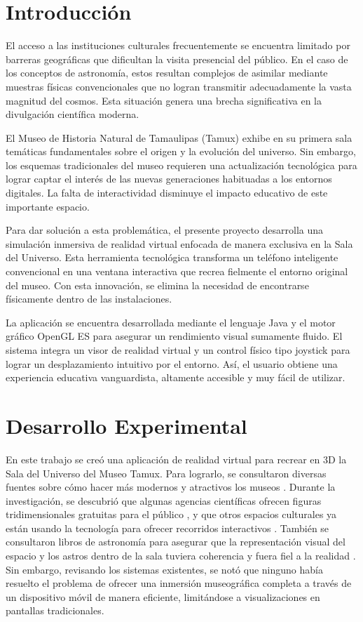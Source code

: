 \documentclass[conference]{IEEEtran}
\begin{document}
		
		
		
		\section{Introducción}
		El acceso a las instituciones culturales frecuentemente se encuentra limitado por barreras geográficas que dificultan la visita presencial del público. En el caso de los conceptos de astronomía, estos resultan complejos de asimilar mediante muestras físicas convencionales que no logran transmitir adecuadamente la vasta magnitud del cosmos. Esta situación genera una brecha significativa en la divulgación científica moderna.
		
		El Museo de Historia Natural de Tamaulipas (Tamux) exhibe en su primera sala temáticas fundamentales sobre el origen y la evolución del universo. Sin embargo, los esquemas tradicionales del museo requieren una actualización tecnológica para lograr captar el interés de las nuevas generaciones habituadas a los entornos digitales. La falta de interactividad disminuye el impacto educativo de este importante espacio.
		
		Para dar solución a esta problemática, el presente proyecto desarrolla una simulación inmersiva de realidad virtual enfocada de manera exclusiva en la Sala del Universo. Esta herramienta tecnológica transforma un teléfono inteligente convencional en una ventana interactiva que recrea fielmente el entorno original del museo. Con esta innovación, se elimina la necesidad de encontrarse físicamente dentro de las instalaciones.
		
		La aplicación se encuentra desarrollada mediante el lenguaje Java y el motor gráfico OpenGL ES para asegurar un rendimiento visual sumamente fluido. El sistema integra un visor de realidad virtual y un control físico tipo joystick para lograr un desplazamiento intuitivo por el entorno. Así, el usuario obtiene una experiencia educativa vanguardista, altamente accesible y muy fácil de utilizar.
		
		
		
		
		\section{Desarrollo Experimental}
		En este trabajo se creó una aplicación de realidad virtual para recrear en 3D la Sala del Universo del Museo Tamux. Para lograrlo, se consultaron diversas fuentes sobre cómo hacer más modernos y atractivos los museos \cite{Simon2010}. Durante la investigación, se descubrió que algunas agencias científicas ofrecen figuras tridimensionales gratuitas para el público \cite{nasa_3d_resources}, y que otros espacios culturales ya están usando la tecnología para ofrecer recorridos interactivos \cite{smithsonian_educator_tools}. También se consultaron libros de astronomía para asegurar que la representación visual del espacio y los astros dentro de la sala tuviera coherencia y fuera fiel a la realidad \cite{Fraknoi2022}. Sin embargo, revisando los sistemas existentes, se notó que ninguno había resuelto el problema de ofrecer una inmersión museográfica completa a través de un dispositivo móvil de manera eficiente, limitándose a visualizaciones en pantallas tradicionales.
		
\end{document}
